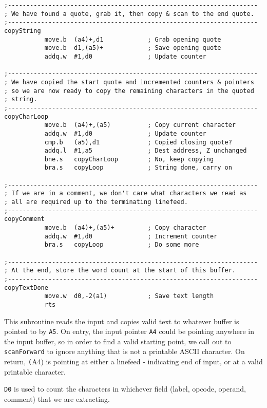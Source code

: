 \begin{lstlisting}[firstnumber=last,caption={ASMReformat Source - Copying Input Source Lines Around}]
;--------------------------------------------------------------------
; We have found a quote, grab it, then copy & scan to the end quote.
;--------------------------------------------------------------------
copyString
           move.b  (a4)+,d1            ; Grab opening quote
           move.b  d1,(a5)+            ; Save opening quote
           addq.w  #1,d0               ; Update counter

;--------------------------------------------------------------------
; We have copied the start quote and incremented counters & pointers
; so we are now ready to copy the remaining characters in the quoted
; string.
;--------------------------------------------------------------------
copyCharLoop
           move.b  (a4)+,(a5)          ; Copy current character
           addq.w  #1,d0               ; Update counter
           cmp.b   (a5),d1             ; Copied closing quote?
           addq.l  #1,a5               ; Dest address, Z unchanged
           bne.s   copyCharLoop        ; No, keep copying
           bra.s   copyLoop            ; String done, carry on	

;--------------------------------------------------------------------
; If we are in a comment, we don't care what characters we read as 
; all are required up to the terminating linefeed.
;--------------------------------------------------------------------
copyComment
           move.b  (a4)+,(a5)+         ; Copy character
           addq.w  #1,d0               ; Increment counter
           bra.s   copyLoop            ; Do some more

;--------------------------------------------------------------------
; At the end, store the word count at the start of this buffer.
;--------------------------------------------------------------------
copyTextDone
           move.w  d0,-2(a1)           ; Save text length
           rts
\end{lstlisting}

This subroutine reads the input and copies valid text to whatever buffer is pointed to by \texttt{A5}. On entry, the input pointer \texttt{A4} could be pointing anywhere in the input buffer, so in order to find a valid starting point, we call out to \texttt{scanForward} to ignore anything that is not a printable ASCII character.
On return, \texttt(A4) is pointing at either a linefeed - indicating end of input, or at a valid printable character.

\texttt{D0} is used to count the characters in whichever field (label, opcode, operand, comment) that we are extracting.

